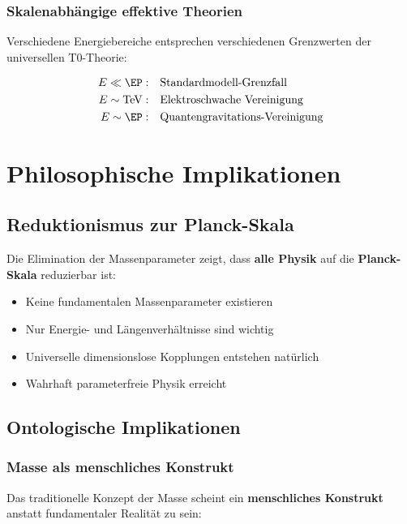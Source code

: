 	\subsubsection{Skalenabhängige effektive Theorien}
	
	Verschiedene Energiebereiche entsprechen verschiedenen Grenzwerten der universellen T0-Theorie:
	
	\begin{align}
		E \ll \EP: \quad &\text{Standardmodell-Grenzfall} \\
		E \sim \text{TeV}: \quad &\text{Elektroschwache Vereinigung} \\
		E \sim \EP: \quad &\text{Quantengravitations-Vereinigung}
	\end{align}
	
	\section{Philosophische Implikationen}
	\label{sec:philosophical}
	
	\subsection{Reduktionismus zur Planck-Skala}
	\label{subsec:reductionism}
	
	Die Elimination der Massenparameter zeigt, dass \textbf{alle Physik} auf die \textbf{Planck-Skala} reduzierbar ist:
	
	\begin{itemize}
		\item Keine fundamentalen Massenparameter existieren
		\item Nur Energie- und Längenverhältnisse sind wichtig
		\item Universelle dimensionslose Kopplungen entstehen natürlich
		\item Wahrhaft parameterfreie Physik erreicht
	\end{itemize}
	
	\subsection{Ontologische Implikationen}
	\label{subsec:ontological}
	
	\subsubsection{Masse als menschliches Konstrukt}
	
	Das traditionelle Konzept der Masse scheint ein \textbf{menschliches Konstrukt} anstatt fundamentaler Realität zu sein:
	
